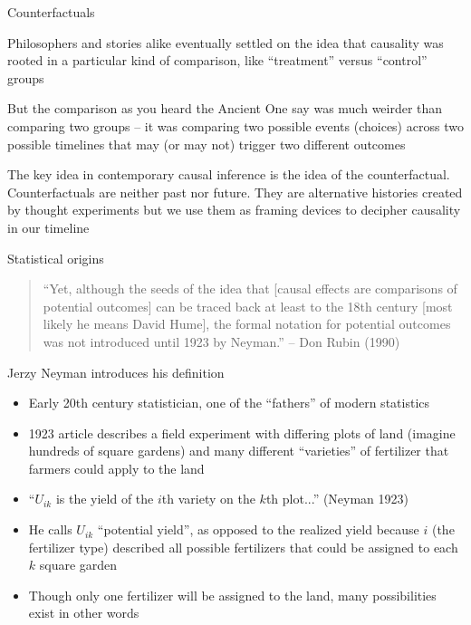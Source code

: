 \documentclass{beamer}
\begin{document}
  \begin{frame}{Counterfactuals}
  
  Philosophers and stories alike eventually settled on the idea that causality was rooted in a particular kind of comparison, like ``treatment'' versus ``control'' groups
  
  \bigskip
  
  But the comparison as you heard the Ancient One say was much weirder than comparing two groups -- it was comparing two possible events (choices) across two possible timelines that may (or may not) trigger two different outcomes
  
  \bigskip
  
  The key idea in contemporary causal inference is the idea of the counterfactual. Counterfactuals are neither past nor future.  They are alternative histories created by thought experiments but we use them as framing devices to decipher causality in our timeline

\end{frame}

\begin{frame}{Statistical origins}

\begin{quote}
``Yet, although the seeds of the idea that [causal effects are comparisons of potential outcomes] can be traced back at least to the 18th century [most likely he means David Hume], the formal notation for potential outcomes was not introduced until 1923 by Neyman.'' -- Don Rubin (1990)
\end{quote}

\end{frame}


\begin{frame}{Jerzy Neyman introduces his definition}

\begin{itemize}
\item Early 20th century statistician, one of the ``fathers'' of modern statistics
\item 1923 article describes a field experiment with differing plots of land (imagine hundreds of square gardens) and many different ``varieties'' of fertilizer that farmers could apply to the land
\item ``$U_{ik}$ is the yield of the $i$th variety on the $k$th plot...'' (Neyman 1923)
\item He calls $U_{ik}$ ``potential yield'', as opposed to the realized yield because $i$ (the fertilizer type) described all possible fertilizers that could be assigned to each $k$ square garden
\item Though only one fertilizer will be assigned to the land, many possibilities exist in other words
\end{itemize}

\end{frame}
\end{document}
